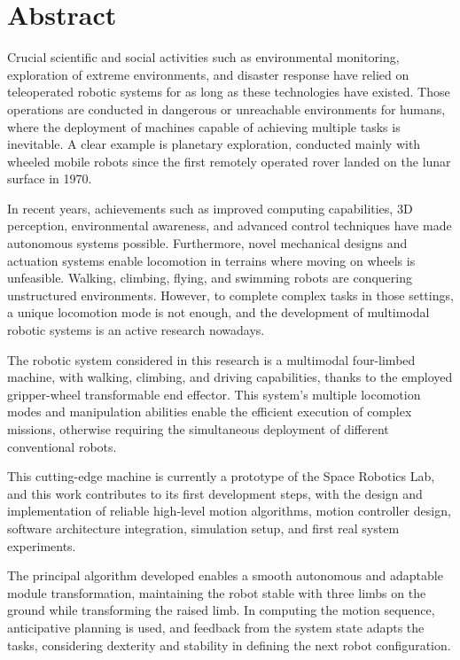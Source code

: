 \chapter*{Abstract} 

Crucial scientific and social activities such as environmental monitoring, exploration of extreme environments, and disaster response have relied on teleoperated robotic systems for as long as these technologies have existed.
Those operations are conducted in dangerous or unreachable environments for humans, where the deployment of machines capable of achieving multiple tasks is inevitable. A clear example is planetary exploration, conducted mainly with wheeled mobile robots since the first remotely operated rover landed on the lunar surface in 1970. 

In recent years, achievements such as improved computing capabilities, 3D perception, environmental awareness, and advanced control techniques have made autonomous systems possible. Furthermore, novel mechanical designs and actuation systems enable locomotion in terrains where moving on wheels is unfeasible. Walking, climbing, flying, and swimming robots are conquering unstructured environments.
However, to complete complex tasks in those settings, a unique locomotion mode is not enough, and the development of multimodal robotic systems is an active research nowadays.     


The robotic system considered in this research is a multimodal four-limbed machine, with walking, climbing, and driving capabilities, thanks to the employed gripper-wheel transformable end effector. This system's multiple locomotion modes and manipulation abilities enable the efficient execution of complex missions, otherwise requiring the simultaneous deployment of different conventional robots.

This cutting-edge machine is currently a prototype of the Space Robotics Lab, and this work contributes to its first development steps, with the design and implementation of reliable high-level motion algorithms, motion controller design, software architecture integration, simulation setup, and first real system experiments. 

The principal algorithm developed enables a smooth autonomous and adaptable module transformation, maintaining the robot stable with three limbs on the ground while transforming the raised limb. In computing the motion sequence, anticipative planning is used, and feedback from the system state adapts the tasks, considering dexterity and stability in defining the next robot configuration. 

